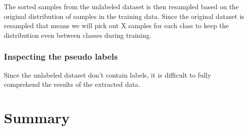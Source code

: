 \documentclass[thesis.tex]{subfiles}
\begin{document}
The sorted samples from the unlabeled dataset is then resampled based on the original distribution of samples in the training data. Since the original dataset is resampled that means we will pick out X samples for each class to keep the distribution even between classes during training.




\subsubsection{Inspecting the pseudo labels}
Since the unlabeled dataset don't contain labels, it is difficult to fully comprehend the results of the extracted data.








\section{Summary} \label{sec:C3-summary}
\end{document}
